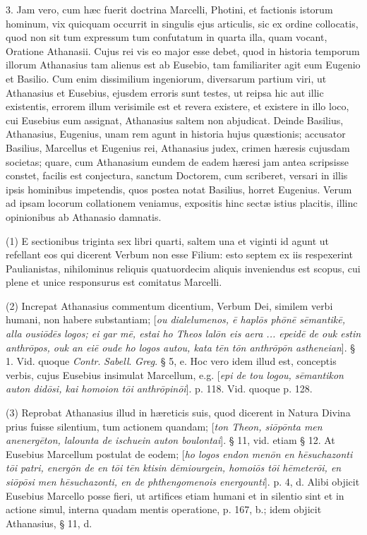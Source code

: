 3.
Jam vero, cum hæc fuerit doctrina Marcelli, Photini, et factionis
istorum hominum, vix quicquam occurrit in singulis ejus articulis, sic
ex ordine collocatis, quod non sit tum expressum tum confutatum in
quarta illa, quam vocant, Oratione Athanasii. Cujus rei vis eo major
esse debet, quod in historia temporum illorum Athanasius tam
alienus est ab Eusebio, tam familiariter agit eum Eugenio et Basilio.
Cum enim dissimilium ingeniorum, diversarum partium viri, ut
Athanasius et Eusebius, ejusdem erroris sunt testes, ut reipsa hic aut
illic existentis, errorem illum verisimile est et revera existere, et
existere in illo loco, cui Eusebius eum assignat, Athanasius saltem
non abjudicat. Deinde Basilius, Athanasius, Eugenius, unam rem agunt
in historia hujus quæstionis; accusator Basilius, Marcellus et
Eugenius rei, Athanasius judex, crimen hæresis cujusdam societas;
quare, cum Athanasium eundem de eadem hæresi jam antea scripsisse
constet, facilis est conjectura, sanctum Doctorem, cum scriberet,
versari in illis ipsis hominibus impetendis, quos postea notat
Basilius, horret Eugenius. Verum ad ipsam locorum collationem veniamus,
expositis hinc sectæ istius placitis, illinc opinionibus ab Athanasio
damnatis.

(1)
E sectionibus triginta sex libri quarti, saltem una et viginti id
agunt ut refellant eos qui dicerent Verbum non esse Filium: esto
septem ex iis respexerint Paulianistas, nihilominus reliquis
quatuordecim aliquis inveniendus est scopus, cui plene et unice
responsurus est comitatus Marcelli.

(2)
Increpat Athanasius commentum dicentium, Verbum Dei, similem verbi
humani, non habere substantiam; [\emph{ou dialelumenos, \={e} hapl\={o}s
ph\={o}n\={e} s\={e}mantik\={e}, alla ousi\={o}d\={e}s
logos; ei gar m\={e}, estai ho Theos lal\={o}n eis aera ...
epeid\={e} de ouk estin anthr\={o}pos, ouk an ei\={e} oude ho
logos autou, kata t\={e}n t\={o}n anthr\={o}p\={o}n
astheneian}]. § 1. Vid. quoque \emph{Contr}. \emph{Sabell}. \emph{Greg}.
§ 5, e. Hoc vero idem illud est, conceptis verbis, cujus
Eusebius insimulat Marcellum, e.g. [\emph{epi de tou logou, s\={e}mantikon
auton did\={o}si, kai homoion t\={o}i anthr\={o}pin\={o}i}].
p. 118. Vid. quoque p. 128.

(3) Reprobat Athanasius illud
in hæreticis suis, quod dicerent in Natura Divina prius fuisse
silentium, tum actionem quandam; [\emph{ton Theon, si\={o}p\={o}nta
men anenerg\={e}ton, lalounta de ischuein auton boulontai}]. §
11, vid. etiam § 12. At Eusebius Marcellum postulat de eodem; [\emph{ho
logos endon men\={o}n en h\={e}suchazonti t\={o}i patri,
energ\={o}n de en t\={o}i t\={e}n ktisin d\={e}miourgein,
homoi\={o}s t\={o}i h\={e}meter\={o}i, en si\={o}p\={o}si
men h\={e}suchazonti, en de phthengomenois energounti}].
p. 4, d. Alibi objicit Eusebius Marcello posse fieri, ut artifices
etiam humani et in silentio sint et in actione simul, interna quadam
mentis operatione, p. 167, b.; idem objicit Athanasius, § 11, d.

